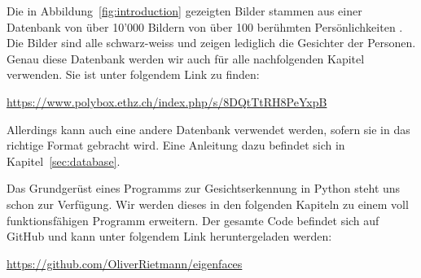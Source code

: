 Die in Abbildung~\ref{fig:introduction} gezeigten Bilder stammen aus einer Datenbank von über 10'000 Bildern von über 100 berühmten Persönlichkeiten \cite{Chen14}.
Die Bilder sind alle schwarz-weiss und zeigen lediglich die Gesichter der Personen.
Genau diese Datenbank werden wir auch für alle nachfolgenden Kapitel verwenden.
Sie ist unter folgendem Link zu finden:
\begin{center}
	\url{https://www.polybox.ethz.ch/index.php/s/8DQtTtRH8PeYxpB}
\end{center}
Allerdings kann auch eine andere Datenbank verwendet werden, sofern sie in das richtige Format gebracht wird.
Eine Anleitung dazu befindet sich in Kapitel~\ref{sec:database}.

Das Grundgerüst eines Programms zur Gesichtserkennung in Python steht uns schon zur Verfügung.
Wir werden dieses in den folgenden Kapiteln zu einem voll funktionsfähigen Programm erweitern.
Der gesamte Code befindet sich auf GitHub und kann unter folgendem Link heruntergeladen werden:
\begin{center}
	\url{https://github.com/OliverRietmann/eigenfaces}
\end{center}
